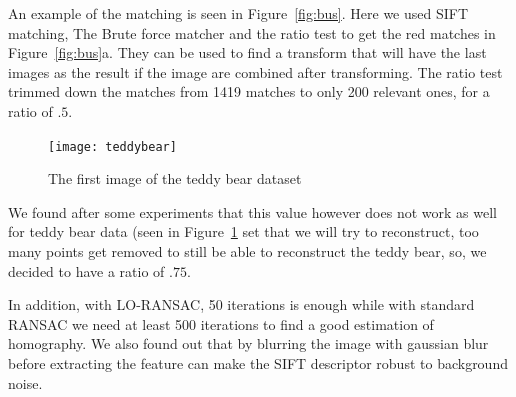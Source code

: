 An example of the matching is seen in Figure~\ref{fig:bus}. 
Here we used SIFT matching, The Brute force matcher and the ratio test to get the red matches in Figure~\ref{fig:bus}a. 
They can be used to find a transform that will have the last images as the result if the image are combined after transforming.
The ratio test trimmed down the matches from 1419 matches to only 200 relevant ones, for a ratio of $.5$.

\begin{figure}[ht]
	\centering
	\texttt{[image: teddybear]}
	\caption{The first image of the teddy bear dataset}
	\label{fig:bear}
\end{figure}

We found after some experiments that this value however does not work as well for teddy bear data (seen in Figure~\ref{fig:bear} set that we will try to reconstruct,
too many points get removed to still be able to reconstruct the teddy bear,
so, we decided to have a ratio of $.75$.

In addition, with LO-RANSAC, 50 iterations is enough while with standard RANSAC we need at least 500 iterations to find a good estimation of homography.
We also found out that by blurring the image with gaussian blur before extracting the feature can make the SIFT descriptor robust to background noise.

